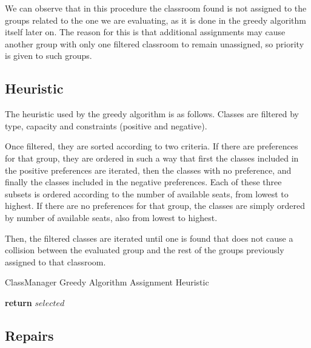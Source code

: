 We can observe that in this procedure the classroom found is not assigned to the groups related to the one we are evaluating, as it is done in the greedy algorithm itself later on. The reason for this is that additional assignments may cause another group with only one filtered classroom to remain unassigned, so priority is given to such groups.


\subsection{Heuristic}

The heuristic used by the greedy algorithm is as follows. Classes are filtered by type, capacity and constraints (positive and negative). 

Once filtered, they are sorted according to two criteria. If there are preferences for that group, they are ordered in such a way that first the classes included in the positive preferences are iterated, then the classes with no preference, and finally the classes included in the negative preferences. Each of these three subsets is ordered according to the number of available seats, from lowest to highest. If there are no preferences for that group, the classes are simply ordered by number of available seats, also from lowest to highest.

Then, the filtered classes are iterated until one is found that does not cause a collision between the evaluated group and the rest of the groups previously assigned to that classroom.

\begin{algorithm}[H]
    \caption{ClassManager Greedy Algorithm Assignment Heuristic}
    \begin{algorithmic}[1]
                 
                \EndIf
            \EndFor
            \State \textbf{return} $selected$
        \EndProcedure
    \end{algorithmic}
\end{algorithm}


\subsection{Repairs}

